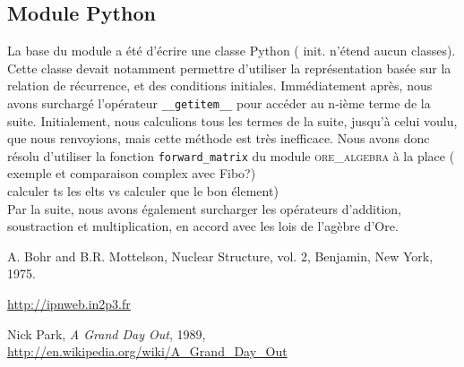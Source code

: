 \documentclass[final,12pt]{article}
\begin{document}
    \subsection{Module Python}
        \label{ssec:py}
        La base du module a été d'écrire une classe Python ({\color{red} init. n'étend aucun classes}). Cette classe devait notamment permettre
        d'utiliser la représentation basée sur la relation de récurrence, et des conditions initiales.
        Immédiatement après, nous avons surchargé l'opérateur \texttt{\_\_getitem\_\_} pour accéder
        au n-ième terme de la suite. Initialement, nous calculions tous les termes de la suite, jusqu'à 
        celui voulu, que nous renvoyions, mais cette méthode est très inefficace. Nous avons donc résolu
        d'utiliser la fonction \texttt{forward\_matrix} du module \textsc{ore\_algebra} à la place ({\color{red} exemple
        et comparaison complex avec Fibo?}) 
        \\{\color{red}calculer ts les elts vs calculer que le bon élement})\\
        Par la suite, nous avons également surcharger les opérateurs d'addition, soustraction et multiplication, 
        en accord avec les lois de l'agèbre d'Ore.




\begin{thebibliography}{}
A. Bohr and B.R. Mottelson, Nuclear Structure, vol. 2, Benjamin,
New York, 1975.

 \url{http://ipnweb.in2p3.fr}

 Nick Park, \textsl{A Grand Day Out}, 1989, \url{http://en.wikipedia.org/wiki/A_Grand_Day_Out}

\end{thebibliography}
\end{document}
